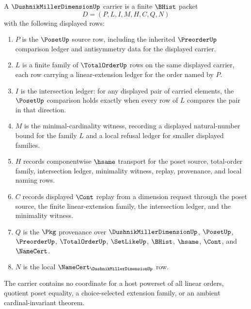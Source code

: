 \begin{definition}
\label{def:dushnik-miller-dimension-carrier}
A $\DushnikMillerDimensionUp$ carrier is a finite $\BHist$ packet
$$
D=(P,L,I,M,H,C,Q,N)
$$
with the following displayed rows:
\begin{enumerate}
\item $P$ is the $\PosetUp$ source row, including the inherited $\PreorderUp$ comparison ledger and antisymmetry data for the displayed carrier.
\item $L$ is a finite family of $\TotalOrderUp$ rows on the same displayed carrier, each row carrying a linear-extension ledger for the order named by $P$.
\item $I$ is the intersection ledger: for any displayed pair of carried elements, the $\PosetUp$ comparison holds exactly when every row of $L$ compares the pair in that direction.
\item $M$ is the minimal-cardinality witness, recording a displayed natural-number bound for the family $L$ and a local refusal ledger for smaller displayed families.
\item $H$ records componentwise $\hsame$ transport for the poset source, total-order family, intersection ledger, minimality witness, replay, provenance, and local naming rows.
\item $C$ records displayed $\Cont$ replay from a dimension request through the poset source, the finite linear-extension family, the intersection ledger, and the minimality witness.
\item $Q$ is the $\Pkg$ provenance over $\DushnikMillerDimensionUp$, $\PosetUp$, $\PreorderUp$, $\TotalOrderUp$, $\SetLikeUp$, $\BHist$, $\hsame$, $\Cont$, and $\NameCert$.
\item $N$ is the local $\NameCert_{\DushnikMillerDimensionUp}$ row.
\end{enumerate}
The carrier contains no coordinate for a host powerset of all linear orders, quotient poset equality, a choice-selected extension family, or an ambient cardinal-invariant theorem.
\end{definition}

